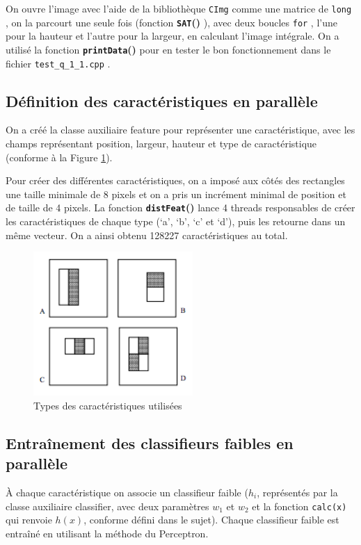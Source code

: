\documentclass[a4paper, 12pt,twoside]{article}
\newcommand{\func}[1]{
\textbf{\texttt{#1}()}
}
\newcommand{\param}[1]{
\texttt{#1}
}
\begin{document}
	On ouvre l’image avec l’aide de la bibliothèque \param{CImg} comme une matrice de \param{long}, on la parcourt une seule fois (fonction \func{SAT}), avec deux boucles \param{for}, l’une pour la hauteur et l’autre pour la largeur, en calculant l’image intégrale. On a utilisé la fonction \func{printData} pour en tester le bon fonctionnement dans le fichier \param{test\_q\_1\_1.cpp}.


\subsection{Définition des caractéristiques en parallèle}

	On a créé la classe auxiliaire feature pour représenter une caractéristique, avec les champs représentant position, largeur, hauteur et type de caractéristique (conforme à la Figure \ref{caracteristiques}).
	
	Pour créer des différentes caractéristiques, on a imposé aux côtés des rectangles une taille minimale de 8 pixels et on a pris un incrément minimal de position et de taille de  4 pixels. La fonction \func{distFeat} lance 4 threads responsables de créer les caractéristiques de chaque type (‘a’, ‘b’, ‘c’ et ‘d’), puis les retourne dans un même vecteur. On a ainsi obtenu 128227 caractéristiques au total.


\begin{figure}[htbp]
\centering
\includegraphics[scale=0.8]{charact}
\caption{Types des caractéristiques utilisées}
\label{caracteristiques}
\end{figure}

\subsection{Entraînement des classifieurs faibles en parallèle}

	À chaque caractéristique on associe un classifieur faible ($h_i$, représentés par la classe auxiliaire classifier, avec deux paramètres $w_1$ et $w_2$ et la fonction \param{calc(x)} qui renvoie $h(x)$, conforme défini dans le sujet). Chaque classifieur faible est entraîné en utilisant la méthode du Perceptron.
	
\end{document}
